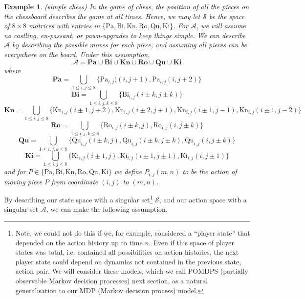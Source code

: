 \documentclass[12pt]{article}
\newtheorem{example}{Example}
\begin{document}
\begin{example}{(simple chess)}
    In the game of chess, the position of all the pieces on the chessboard describes the game at all times. Hence, we may let 
    $\mathcal{S}$ be the space of $8 \times 8$ matrices with entries in $\{\text{Pa}, \text{Bi}, \text{Kn}, \text{Ro}, \text{Qu}, 
    \text{Ki}\}$. For $\mathcal{A}$, we will assume no castling, \textit{en-passant}, or pawn-upgrades to keep things simple. We 
    can describe $\mathcal{A}$ by describing the possible moves for each piece, and assuming all pieces can be everywhere on 
    the board. Under this assumption, 
    $$
    \mathcal{A} = \textbf{Pa} \cup \textbf{Bi} \cup \textbf{Kn} \cup \textbf{Ro} \cup \textbf{Qu} \cup \textbf{Ki}
    $$
    where 
    $$
    \textbf{Pa} = \bigcup_{1 \leq i, j \leq 8} \{\text{Pa}_{i, j}((i, j+1), \text{Pa}_{i, j}(i, j+2)\}
    $$
    $$
    \textbf{Bi} = \bigcup_{1 \leq i, j, k \leq 8}\{\text{Bi}_{i, j}(i \pm k, j \pm k)\}
    $$
    $$
    \textbf{Kn} = \bigcup_{1 \leq i, j \leq 8}\{\text{Kn}_{i,j}(i \pm 1, j + 2), \text{Kn}_{i,j}(i \pm 2, j + 1), \text{Kn}_{i,j}(i \pm 1, j - 1), 
    \text{Kn}_{i,j}(i \pm 1, j - 2)\}
    $$
    $$
    \textbf{Ro} = \bigcup_{1 \leq i, j, k \leq 8}\{\text{Ro}_{i, j}(i \pm k, j), \text{Ro}_{i, j}(i, j \pm k)\}
    $$
    $$
    \textbf{Qu} = \bigcup_{1 \leq i, j, k \leq 8}\{\text{Qu}_{i, j}(i \pm k, j), \text{Qu}_{i, j}(i \pm k, j \pm k), 
    \text{Qu}_{i, j}(i, j \pm k)\}
    $$
    $$
    \textbf{Ki} = \bigcup_{1 \leq i, j \leq 8}\{\text{Ki}_{i, j}(i \pm 1, j), \text{Ki}_{i, j}(i \pm 1, j \pm 1), 
    \text{Ki}_{i, j}(i, j \pm 1)\}
    $$
    and for $P \in \{\text{Pa}, \text{Bi}, \text{Kn}, \text{Ro}, \text{Qu}, \text{Ki}\}$ we define $P_{i, j}(m, n)$ to be 
    the action of moving piece $P$ from coordinate $(i, j)$ to $(m, n)$.
\end{example}

By describing our state space with a singular set\footnote{
    Note, we could not do this if we, for example, considered a ``player state'' that depended on the action history up to 
    time $n$. Even if this space of player states was total, i.e. contained all possibilities on action histories, the next 
    player state could depend on dynamics not contained in the previous state, action pair. We will consider these models, 
    which we call POMDPS (partially observable Markov decision processes) next section, as a natural generalisation to our 
    MDP (Markov decision process) model. 
} $\mathcal{S}$, and our action space with a singular set $\mathcal{A}$, we can make the following assumption. 
\end{document}
